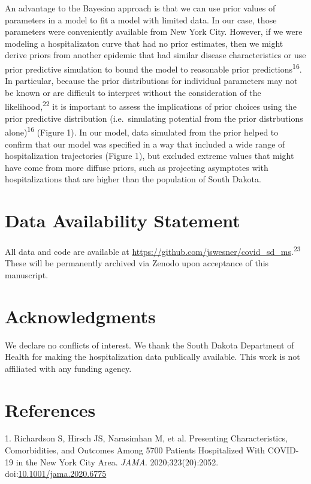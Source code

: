 \documentclass[
]{article}
\begin{document}
An advantage to the Bayesian approach is that we can use prior values of parameters in a model to fit a model with limited data. In our case, those parameters were conveniently available from New York City. However, if we were modeling a hospitalizaton curve that had no prior estimates, then we might derive priors from another epidemic that had similar disease characteristics or use prior predictive simulation to bound the model to reasonable prior predictions\textsuperscript{16}. In particular, because the prior distributions for individual parameters may not be known or are difficult to interpret without the consideration of the likelihood,\textsuperscript{22} it is important to assess the implications of prior choices using the prior predictive distribution (i.e.~simulating potential from the prior distrbutions alone)\textsuperscript{16} (Figure 1). In our model, data simulated from the prior helped to confirm that our model was specified in a way that included a wide range of hospitalization trajectories (Figure 1), but excluded extreme values that might have come from more diffuse priors, such as projecting asymptotes with hospitalizations that are higher than the population of South Dakota.

\hypertarget{data-availability-statement}{%
\section{Data Availability Statement}\label{data-availability-statement}}

All data and code are available at \url{https://github.com/jswesner/covid_sd_ms}.\textsuperscript{23} These will be permanently archived via Zenodo upon acceptance of this manuscript.

\hypertarget{acknowledgments}{%
\section{Acknowledgments}\label{acknowledgments}}

We declare no conflicts of interest. We thank the South Dakota Department of Health for making the hospitalization data publically available. This work is not affiliated with any funding agency.

\hypertarget{references}{%
\section{References}\label{references}}

\hypertarget{refs}{}
\leavevmode\hypertarget{ref-richardson_presenting_2020}{}%
1. Richardson S, Hirsch JS, Narasimhan M, et al. Presenting Characteristics, Comorbidities, and Outcomes Among 5700 Patients Hospitalized With COVID-19 in the New York City Area. \emph{JAMA}. 2020;323(20):2052. doi:\href{https://doi.org/10.1001/jama.2020.6775}{10.1001/jama.2020.6775}
\end{document}
